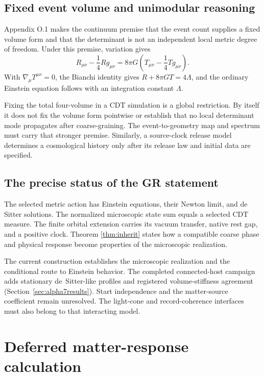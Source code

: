 \subsection{Fixed event volume and unimodular reasoning}

Appendix O.1 makes the continuum premise that the event count supplies a fixed volume form and that the determinant is not an independent local metric degree of freedom. Under this premise, variation gives
\begin{equation}
R_{\mu\nu}-\frac14Rg_{\mu\nu}
=8\pi G\left(T_{\mu\nu}-\frac14Tg_{\mu\nu}\right).
\end{equation}
With $\nabla_\mu T^{\mu\nu}=0$, the Bianchi identity gives
$R+8\pi GT=4\Lambda$, and the ordinary Einstein equation follows with an integration constant $\Lambda$.

Fixing the total four-volume in a CDT simulation is a global restriction. By itself it does not fix the volume form pointwise or establish that no local determinant mode propagates after coarse-graining. The event-to-geometry map and spectrum must carry that stronger premise. Similarly, a source-clock release model determines a cosmological history only after its release law and initial data are specified.

\subsection{The precise status of the GR statement}

The selected metric action has Einstein equations, their Newton limit, and de Sitter solutions. The normalized microscopic state sum equals a selected CDT measure. The finite orbital extension carries its vacuum transfer, native rest gap, and a positive clock. Theorem \ref{thm:inherit} states how a compatible coarse phase and physical response become properties of the microscopic realization.

The current construction establishes the microscopic realization and the conditional route to Einstein behavior. The completed connected-host campaign adds stationary de~Sitter-like profiles and registered volume-stiffness agreement (Section~\ref{sec:alpha7results}). Start independence and the matter-source coefficient remain unresolved. The light-cone and record-coherence interfaces must also belong to that interacting model.

\section{Deferred matter-response calculation}

